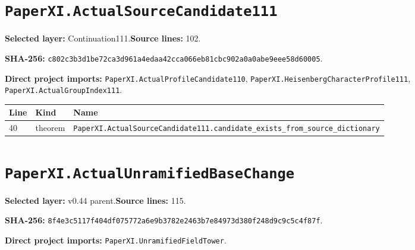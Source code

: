 \documentclass[10pt,oneside]{book}
\begin{document}
\section{\texorpdfstring{\nolinkurl{PaperXI.ActualSourceCandidate111}}{PaperXI.ActualSourceCandidate111}}\label{module:PaperXI.ActualSourceCandidate111}

\textbf{Selected layer:} Continuation111.\quad\textbf{Source lines:} 102.\par\textbf{SHA-256:} {\scriptsize\nolinkurl{c802c3b3d1be72ca3d961a4edaa42cca066eb81cbc902a0a0abe9eee58d60005}}.


\textbf{Direct project imports:} \nolinkurl{PaperXI.ActualProfileCandidate110}, \nolinkurl{PaperXI.HeisenbergCharacterProfile111}, \nolinkurl{PaperXI.ActualGroupIndex111}.

\begin{longtable}{@{}p{}p{}p{}@{}}\toprule Line&Kind&Name\\\midrule\endhead

40&theorem&\nolinkurl{PaperXI.ActualSourceCandidate111.candidate_exists_from_source_dictionary}\\

\bottomrule\end{longtable}

\section{\texorpdfstring{\nolinkurl{PaperXI.ActualUnramifiedBaseChange}}{PaperXI.ActualUnramifiedBaseChange}}\label{module:PaperXI.ActualUnramifiedBaseChange}

\textbf{Selected layer:} v0.44 parent.\quad\textbf{Source lines:} 115.\par\textbf{SHA-256:} {\scriptsize\nolinkurl{8f4e3c5117f404df075772a6e9b3782e2463b7e84973d380f248d9c9c5c4f87f}}.


\textbf{Direct project imports:} \nolinkurl{PaperXI.UnramifiedFieldTower}.
\end{document}
